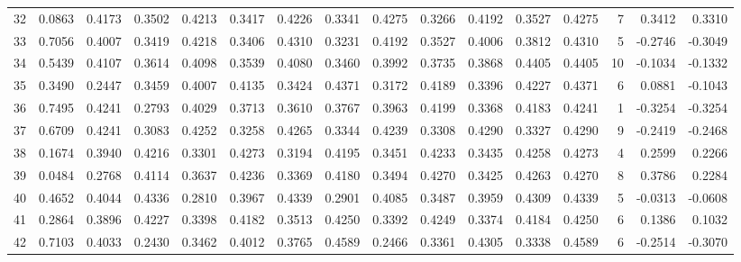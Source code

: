 \begin{tabular}{lrrrrrrrrrrrrrrr}
32  &      0.0863 &  0.4173 &  0.3502 &  0.4213 &  0.3417 &  0.4226 &  0.3341 &  0.4275 &  0.3266 &  0.4192 &   0.3527 &     0.4275 &      7 &                    0.3412 &                     0.3310 \\
33  &      0.7056 &  0.4007 &  0.3419 &  0.4218 &  0.3406 &  0.4310 &  0.3231 &  0.4192 &  0.3527 &  0.4006 &   0.3812 &     0.4310 &      5 &                   -0.2746 &                    -0.3049 \\
34  &      0.5439 &  0.4107 &  0.3614 &  0.4098 &  0.3539 &  0.4080 &  0.3460 &  0.3992 &  0.3735 &  0.3868 &   0.4405 &     0.4405 &     10 &                   -0.1034 &                    -0.1332 \\
35  &      0.3490 &  0.2447 &  0.3459 &  0.4007 &  0.4135 &  0.3424 &  0.4371 &  0.3172 &  0.4189 &  0.3396 &   0.4227 &     0.4371 &      6 &                    0.0881 &                    -0.1043 \\
36  &      0.7495 &  0.4241 &  0.2793 &  0.4029 &  0.3713 &  0.3610 &  0.3767 &  0.3963 &  0.4199 &  0.3368 &   0.4183 &     0.4241 &      1 &                   -0.3254 &                    -0.3254 \\
37  &      0.6709 &  0.4241 &  0.3083 &  0.4252 &  0.3258 &  0.4265 &  0.3344 &  0.4239 &  0.3308 &  0.4290 &   0.3327 &     0.4290 &      9 &                   -0.2419 &                    -0.2468 \\
38  &      0.1674 &  0.3940 &  0.4216 &  0.3301 &  0.4273 &  0.3194 &  0.4195 &  0.3451 &  0.4233 &  0.3435 &   0.4258 &     0.4273 &      4 &                    0.2599 &                     0.2266 \\
39  &      0.0484 &  0.2768 &  0.4114 &  0.3637 &  0.4236 &  0.3369 &  0.4180 &  0.3494 &  0.4270 &  0.3425 &   0.4263 &     0.4270 &      8 &                    0.3786 &                     0.2284 \\
40  &      0.4652 &  0.4044 &  0.4336 &  0.2810 &  0.3967 &  0.4339 &  0.2901 &  0.4085 &  0.3487 &  0.3959 &   0.4309 &     0.4339 &      5 &                   -0.0313 &                    -0.0608 \\
41  &      0.2864 &  0.3896 &  0.4227 &  0.3398 &  0.4182 &  0.3513 &  0.4250 &  0.3392 &  0.4249 &  0.3374 &   0.4184 &     0.4250 &      6 &                    0.1386 &                     0.1032 \\
42  &      0.7103 &  0.4033 &  0.2430 &  0.3462 &  0.4012 &  0.3765 &  0.4589 &  0.2466 &  0.3361 &  0.4305 &   0.3338 &     0.4589 &      6 &                   -0.2514 &                    -0.3070 \\

\end{tabular}
